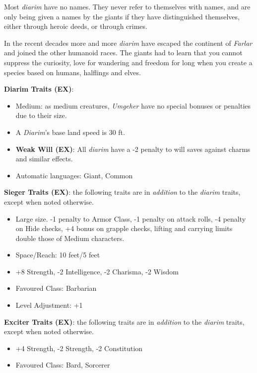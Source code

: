 Most \emph{diarim} have no names. They never refer to themselves with names,
and are only being given a names by the giants if they have distinguished
themselves, either through heroic deeds, or through crimes.

In the recent decades more and more \emph{diarim} have escaped the continent
of \emph{Farlar} and joined the other humanoid races. The giants had to learn
that you cannot suppress the curiosity, love for wandering and freedom for long
when you create a species based on humans, halflings and elves.

\begin{35e}
  \textbf{Diarim Traits (EX)}:
  \begin{itemize}[noitemsep]
    \item Medium: as medium creatures, \emph{Umgeher} have no special bonuses or
    penalties due to their size.
    \item A \emph{Diarim}'s base land speed is 30 ft.
    \item \textbf{Weak Will (EX)}: All \emph{diarim} have a -2 penalty to will
    saves against charms and similar effects.
    \item Automatic languages: Giant, Common
  \end{itemize}

  \textbf{Sieger Traits (EX)}: the following traits are in \emph{addition} to
  the \emph{diarim} traits, except when noted otherwise.
  \begin{itemize}[noitemsep]
    \item Large size. -1 penalty to Armor Class, -1 penalty on attack rolls,
    -4 penalty on Hide checks, +4 bonus on grapple checks, lifting and
    carrying limits double those of Medium characters.
    \item Space/Reach: 10 feet/5 feet
    \item +8 Strength, -2 Intelligence, -2 Charisma, -2 Wisdom
    \item Favoured Class: Barbarian
    \item Level Adjustment: +1
  \end{itemize}

  \textbf{Exciter Traits (EX)}: the following traits are in \emph{addition} to
  the \emph{diarim} traits, except when noted otherwise.
  \begin{itemize}[noitemsep]
    \item +4 Strength, -2 Strength, -2 Constitution
    \item Favoured Class: Bard, Sorcerer
  \end{itemize}
\end{35e}

